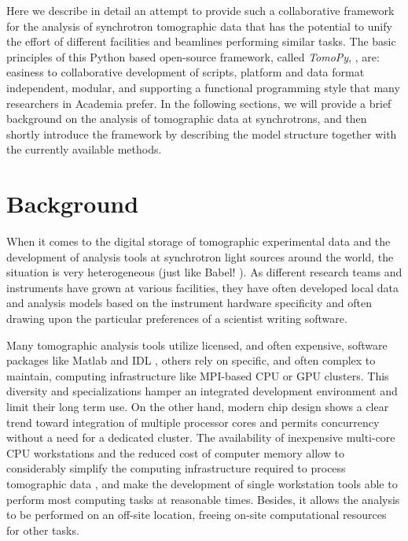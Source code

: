 \documentclass[pdf]{iucr}              %
\begin{document}
Here we describe in detail an attempt to provide such a collaborative framework for the analysis of synchrotron tomographic data that has the potential to unify the effort of different facilities and beamlines performing similar tasks. The basic principles of this Python based open-source framework, called {\it TomoPy}, \cite{python_cpp}, are: easiness to collaborative development of scripts, platform and data format independent, modular,  and supporting a functional programming style that many researchers in Academia prefer. In the following sections, we will provide a brief background on the analysis of tomographic data at synchrotrons, and then shortly introduce the framework by describing the model structure together with the currently available methods. 


\section{Background}

When it comes to the digital storage of tomographic experimental data and the development of analysis tools at synchrotron light sources around the world, the situation is very heterogeneous (just like Babel! \cite{genesis}). As different research teams and instruments have grown at various facilities, they have often developed local data and analysis models based on the instrument hardware specificity and often drawing upon the particular preferences of a scientist writing software. 

Many tomographic analysis tools utilize licensed, and often expensive, software packages like Matlab \cite{matlab} and IDL \cite{exelis_vis}, others rely on specific, and often complex to maintain, computing infrastructure like MPI-based CPU or GPU clusters. This diversity and specializations hamper an integrated development environment and limit their long term use. On the other hand, modern chip design shows a clear trend toward integration of multiple processor cores and permits concurrency without a need for a dedicated cluster. The availability of inexpensive multi-core CPU workstations and the reduced cost of computer memory allow to considerably simplify the computing infrastructure required to process tomographic data \cite{rivers_spie_2012}, and make the development of single workstation tools able to perform most computing tasks at reasonable times. Besides, it allows the analysis to be performed on an off-site location, freeing on-site computational resources for other tasks. 
\end{document}

